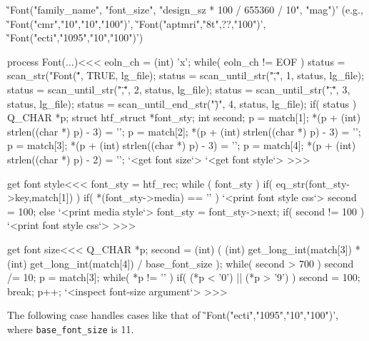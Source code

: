 {%
\EndLink{}

\`'Font("family_name", "font_size", "design_sz * 100 / 655360 / 10", "mag")'
(e.g., \`'Font("cmr","10","10","100")',
\`'Font("aptmri","8t",??,"100")',
\`'Font("ecti","1095","10","100")')







\<process Font(...)\><<<
eoln_ch = (int) 'x';
while( eoln_ch != EOF ) {              
   status = scan_str("Font(\"", TRUE, lg_file);
   status = scan_until_str("\",\"", 1, status, lg_file);
   status = scan_until_str("\",\"", 2, status, lg_file);
   status = scan_until_str("\",\"", 3, status, lg_file);
   status = scan_until_end_str("\")", 4, status, lg_file);
   if( status ){
                      Q_CHAR *p;
                      struct htf_struct *font_sty;
                      int second;
      p = match[1]; 
      *(p + (int) strlen((char *) p) - 3) = '\0'; 
      p = match[2]; 
      *(p + (int) strlen((char *) p) - 3) = '\0'; 
      p = match[3]; 
      *(p + (int) strlen((char *) p) - 3) = '\0'; 
      p = match[4]; 
      *(p + (int) strlen((char *) p) - 2) = '\0'; 
      `<get font size`>
      `<get font style`>
}  }   
>>>





\<get font style\><<<
font_sty = htf_rec;
while ( font_sty  ) {
  if( eq_str(font_sty->key,match[1]) ){          
      if( *(font_sty->media) == '\0'  ){
         `<print font style css`> 
         second = 100;
      } else {
         `<print media style`>
      }
  }
  font_sty = font_sty->next;
}
if( second != 100 ){ `<print font style css`> }
>>>




\<get font size\><<<
{                                                  Q_CHAR *p;
   second =   (int) 
              (  (int) get_long_int(match[3])
               * (int) get_long_int(match[4])
               / base_font_size
              );
   while( second > 700 ){  second /= 10; }
   p = match[3];
   while( *p != '\0' ){
     if( (*p < '0') || (*p > '9') ){ second = 100; break; }
     p++;
   }  
   `<inspect font-size argument`>
}
>>>

The following case handles cases like that of \`'Font("ecti","1095","10","100")', where
\Verb=base_font_size= is 11.

}
